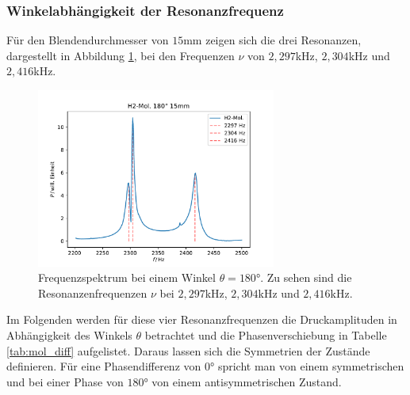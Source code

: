 \subsubsection*{Winkelabhängigkeit der Resonanzfrequenz}
Für den Blendendurchmesser von $15$mm zeigen sich die drei Resonanzen, dargestellt in Abbildung \ref{fig:blende_16_res},
bei den Frequenzen $\nu$ von $2,297$kHz, $2,304$kHz und $2,416$kHz.
\begin{figure}[H]
    \center
    \includegraphics[width=0.7\textwidth]{plots/Hatom/zustandsaufspaltung_mol15.pdf}
    \caption{Frequenzspektrum bei einem Winkel $\theta=180°$. Zu sehen sind die Resonanzenfrequenzen $\nu$ bei $2,297$kHz, $2,304$kHz und $2,416$kHz.}
    \label{fig:blende_16_res}
\end{figure}

Im Folgenden werden für diese vier Resonanzfrequenzen die Druckamplituden in Abhängigkeit des Winkels $\theta$ betrachtet und die Phasenverschiebung in Tabelle \ref{tab:mol_diff} aufgelistet.
Daraus lassen sich die Symmetrien der Zustände definieren. Für eine Phasendifferenz von $0°$ spricht man von einem symmetrischen und bei einer Phase von $180°$ von einem antisymmetrischen Zustand.
\begin{figure}[H]
    \centering
    \hfil
    \hfil 
    
    \hfil
    \caption{}
    \label{fig:polarplots}
\end{figure}

